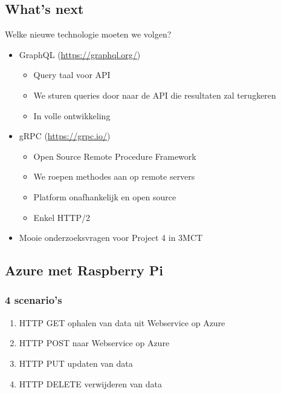\documentclass{article}
\begin{document}
\subsection{What's next}
Welke nieuwe technologie moeten we volgen?

\begin{itemize}
    \item GraphQL (\url{https://graphql.org/})
    \begin{itemize}
        \item Query taal voor API
        \item We sturen queries door naar de API die resultaten zal terugkeren
        \item In volle ontwikkeling
    \end{itemize}
    \item gRPC (\url{https://grpc.io/})
    \begin{itemize}
        \item Open Source Remote Procedure Framework
        \item We roepen methodes aan op remote servers
        \item Platform onafhankelijk en open source
        \item Enkel HTTP/2
    \end{itemize}
    \item Mooie onderzoeksvragen voor Project 4 in 3MCT
\end{itemize}

\subsection{Azure met Raspberry Pi}
\subsubsection{4 scenario's}

\begin{enumerate}
    \item HTTP GET ophalen van data uit Webservice op Azure
    \item HTTP POST naar Webservice op Azure
    \item HTTP PUT updaten van data
    \item HTTP DELETE verwijderen van data
\end{enumerate}
\end{document}
